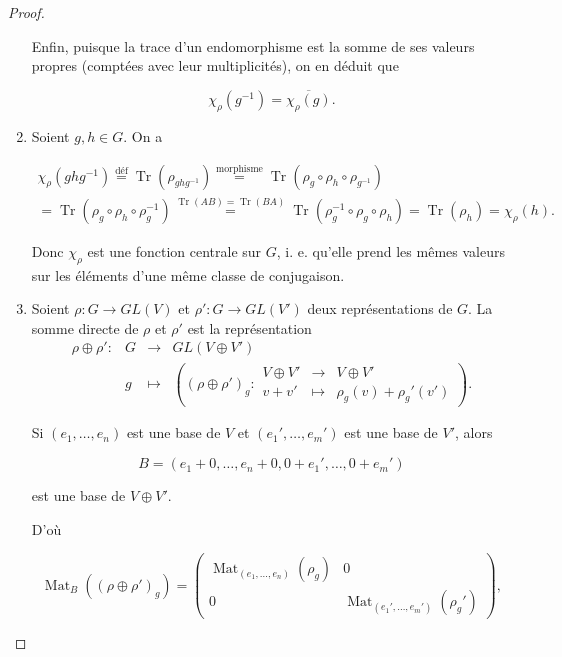 \documentclass[french]{book}
\theoremstyle{definition}
\theoremstyle{remark}
\begin{document}
\begin{proof}
\begin{enumerate}
    Enfin, puisque la trace d'un endomorphisme est la somme de ses valeurs propres (comptées avec leur multiplicités), on en déduit que

    \[\chi _{\rho}(g ^{-1}) = \overline{\chi _{\rho}(g)}. \]

    \item Soient \(g, h \in G\). On a

    \begin{gather*}
      \chi _{\rho}(g h g ^{-1}) \stackrel{\text{déf}}{=} \operatorname{Tr}(\rho _{ghg ^{-1}}) \stackrel{\text{morphisme}}{=} \operatorname{Tr}(\rho_g \circ \rho_h \circ \rho _{g ^{-1}}) \\
      = \operatorname{Tr}(\rho_g \circ \rho_h \circ \rho_g ^{-1}) \stackrel{\operatorname{Tr}(AB) = \operatorname{Tr}(BA)}{=} \operatorname{Tr}(\rho_g ^{-1} \circ \rho_g \circ \rho_h) = \operatorname{Tr}(\rho_h) = \chi _{\rho}(h).
    \end{gather*}

    Donc \(\chi _{\rho}\) est une fonction centrale sur \(G\), i. e. qu'elle prend les mêmes valeurs sur les éléments d'une même classe de conjugaison.

    \item Soient \(\rho : G \longrightarrow GL(V)\) et \(\rho' : G \longrightarrow GL(V')\) deux représentations de \(G\). La somme directe de \(\rho\) et \(\rho'\) est la représentation
     \[\begin{matrix}
      \rho \oplus \rho' : & G & \longrightarrow & GL(V \oplus V') \\
      \ & g & \longmapsto & \left( (\rho \oplus \rho')_g  : \begin{matrix}
      V \oplus V' & \longrightarrow & V \oplus V' \\
      v + v' & \longmapsto & \rho_g(v) + \rho_g'(v')
      \end{matrix}\right).
      \end{matrix}\]

      Si \((e_1, \dots, e_n)\) est une base de \(V\) et \((e_1', \dots, e_m')\) est une base de \(V'\), alors

      \[B = (e_1+0, \dots, e_n+0, 0 + e_1', \dots, 0 + e_m')\]

      est une base de \(V \oplus V'\).

      D'où

      \[\operatorname{Mat}_B((\rho \oplus \rho')_g) = \begin{pmatrix}
      \operatorname{Mat} _{(e_1, \dots, e_n)}(\rho_g) & 0 \\
      0 & \operatorname{Mat} _{(e_1', \dots, e_m')}(\rho_g')
      \end{pmatrix}, \]


\end{enumerate}
\end{proof}
\end{document}
